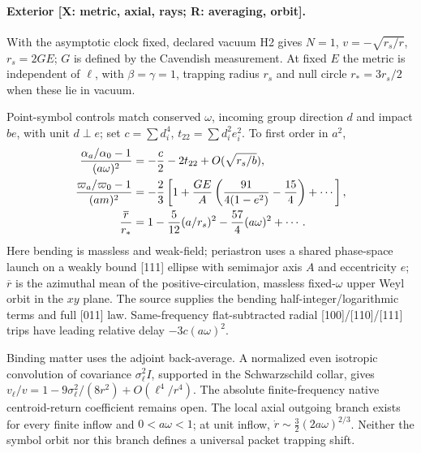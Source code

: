 \paragraph{Exterior [X: metric, axial, rays; R: averaging, orbit].}
With the asymptotic clock fixed, declared vacuum H2 gives $N=1$,
$v=-\sqrt{r_s/r}$, $r_s=2GE$; $G$ is defined by the Cavendish measurement.
At fixed $E$ the metric is independent of $\ell$, with $\beta=\gamma=1$,
trapping radius $r_s$ and null circle $r_*=3r_s/2$ when these lie in vacuum.

Point-symbol controls match conserved $\omega$, incoming group direction
$d$ and impact $b e$, with unit $d\perp e$; set $c=\sum d_i^4$,
$t_{22}=\sum d_i^2e_i^2$. To first order in $a^2$,
\[
\begin{aligned}
 {\alpha_a/\alpha_0-1\over(a\omega)^2}
 &=-{c\over2}-2t_{22}+O(\sqrt{r_s/b}),\\
 {\varpi_a/\varpi_0-1\over(am)^2}
 &=-{2\over3}\left[1+{GE\over A}
 \left({91\over4(1-e^2)}-{15\over4}\right)+\cdots\right],\\
 {\overline r\over r_*}&=1-{5\over12}(a/r_s)^2
                         -{57\over4}(a\omega)^2+\cdots .
\end{aligned}
\]
Here bending is massless and weak-field; periastron uses a shared
phase-space launch on a weakly bound [111] ellipse with semimajor axis $A$
and eccentricity $e$; $\overline r$ is the azimuthal mean of the
positive-circulation, massless fixed-$\omega$ upper Weyl orbit in the $xy$
plane. The source supplies the bending half-integer/logarithmic terms and
full [011] law. Same-frequency flat-subtracted radial [100]/[110]/[111]
trips have leading relative delay $-3c(a\omega)^2$.

Binding matter uses the adjoint back-average. A normalized even isotropic
convolution of covariance $\sigma_\ell^2 I$, supported in the Schwarzschild
collar, gives $v_\ell/v=1-9\sigma_\ell^2/(8r^2)+O(\ell^4/r^4)$.
The absolute finite-frequency native centroid-return coefficient remains
open. The local axial outgoing branch exists for every finite inflow and
$0<a\omega<1$; at unit inflow, $\dot r\sim\tfrac32(2a\omega)^{2/3}$.
Neither the symbol orbit nor this branch defines a universal packet
trapping shift.
